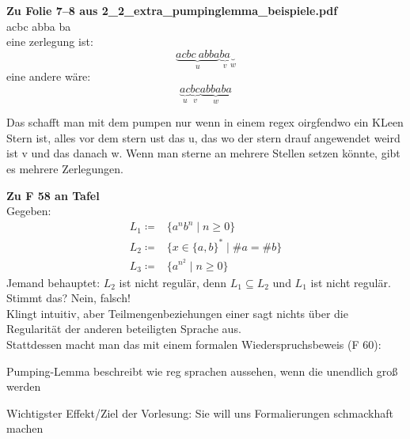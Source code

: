 





\begin{bsp} \textbf{Zu Folie 7--8 aus 2\_2\_extra\_pumpinglemma\_beispiele.pdf } \\
acbc abba ba \\
eine zerlegung ist:
\[
    \underbrace{acbc\ abba}_{u} \underbrace{ba}_{v} \underbrace{\ }_{w}
\]
eine andere wäre:
\[
    \underbrace{ac}_{u} \underbrace{bc}_{v} \underbrace{abba ba}_{w}
\]
\end{bsp}


Das schafft man mit dem pumpen nur wenn in einem regex oirgfendwo ein KLeen Stern ist, alles vor dem stern ust das u,
das wo der stern drauf angewendet weird ist v und das danach w.
Wenn man sterne an mehrere Stellen setzen könnte, gibt es mehrere Zerlegungen.



\begin{bsp} %
    \textbf{Zu F 58 an Tafel} \\
    Gegeben:
    \begin{align*}
        L_1 \coloneqq & \{a^{n}b^n \mid n \geq 0\} \\
        L_2 \coloneqq & \{ x \in \{a,b\}^* \mid \#a = \#b\} \\
        L_3 \coloneqq & \{a^{n^2} \mid n \geq 0\}
    \end{align*}
    Jemand behauptet:
    $L_2$ ist nicht regulär, denn $L_1 \subseteq L_2$ und $L_1$ ist nicht regulär. \\
    Stimmt das?
    Nein, falsch! \\
    Klingt intuitiv, aber Teilmengenbeziehungen einer  sagt nichts über die Regularität der
    anderen beteiligten Sprache aus. \\
    Stattdessen macht man das mit einem formalen Wiederspruchsbeweis (F 60):

\end{bsp}

Pumping-Lemma beschreibt wie reg sprachen aussehen, wenn die unendlich groß werden




Wichtigster Effekt/Ziel der Vorlesung: Sie will uns Formalierungen schmackhaft machen



